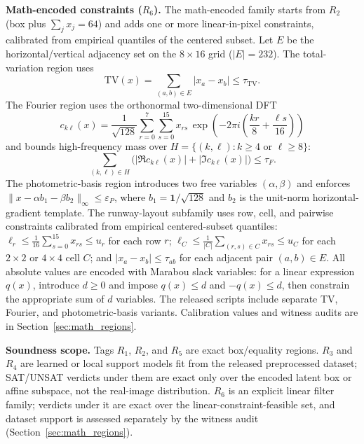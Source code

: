 \documentclass[twocolumn,smallextended,runningheads]{svjour3}
\begin{document}
\textbf{Math-encoded constraints ($R_6$).} The math-encoded family starts from $R_2$ (box plus $\sum_j x_j = 64$) and adds one or more linear-in-pixel constraints, calibrated from empirical quantiles of the centered subset. Let $E$ be the horizontal/vertical adjacency set on the $8{\times}16$ grid ($|E|=232$). The total-variation region uses
\[
\mathrm{TV}(x)=\sum_{(a,b)\in E}|x_a-x_b|\le \tau_{\mathrm{TV}}.
\]
The Fourier region uses the orthonormal two-dimensional DFT
\[
c_{k\ell}(x)=\frac{1}{\sqrt{128}}\sum_{r=0}^{7}\sum_{s=0}^{15}x_{rs}\,\exp\!\!\left(-2\pi i\!\!\left(\frac{kr}{8}{+}\frac{\ell s}{16}\right)\right)
\]
and bounds high-frequency mass over $H=\{(k,\ell):k\ge 4 \text{ or } \ell\ge 8\}$:
\[
\sum_{(k,\ell)\in H}\big(|\Re c_{k\ell}(x)|+|\Im c_{k\ell}(x)|\big)\le \tau_F.
\]
The photometric-basis region introduces two free variables $(\alpha,\beta)$ and enforces $\|x-\alpha b_1-\beta b_2\|_\infty\le \varepsilon_P$, where $b_1=\mathbf{1}/\sqrt{128}$ and $b_2$ is the unit-norm horizontal-gradient template. The runway-layout subfamily uses row, cell, and pairwise constraints calibrated from empirical centered-subset quantiles: $\ell_r \le \tfrac{1}{16}\sum_{s=0}^{15}x_{rs}\le u_r$ for each row $r$; $\ell_C \le \tfrac{1}{|C|}\sum_{(r,s)\in C} x_{rs}\le u_C$ for each $2{\times}2$ or $4{\times}4$ cell $C$; and $|x_a-x_b|\le \tau_{ab}$ for each adjacent pair $(a,b)\in E$. All absolute values are encoded with Marabou slack variables: for a linear expression $q(x)$, introduce $d\ge 0$ and impose $q(x)\le d$ and $-q(x)\le d$, then constrain the appropriate sum of $d$ variables. The released scripts include separate TV, Fourier, and photometric-basis variants. Calibration values and witness audits are in Section~\ref{sec:math_regions}.

\textbf{Soundness scope.} Tags $R_1$, $R_2$, and $R_5$ are exact box/equality regions. $R_3$ and $R_4$ are learned or local support models fit from the released preprocessed dataset; SAT/UNSAT verdicts under them are exact only over the encoded latent box or affine subspace, not the real-image distribution. $R_6$ is an explicit linear filter family; verdicts under it are exact over the linear-constraint-feasible set, and dataset support is assessed separately by the witness audit (Section~\ref{sec:math_regions}).
\end{document}
